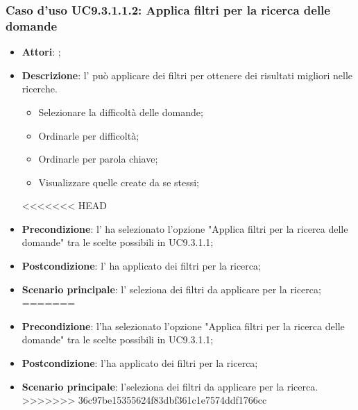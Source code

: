 		 \subsubsection{Caso d'uso UC9.3.1.1.2: Applica filtri per la ricerca delle domande}
		 \label{UC9.3.1.1.2}
		 \begin{itemize}
		 	\item \textbf{Attori}: \uaupro{};
		 	\item \textbf{Descrizione}: l'\uaupro{} può applicare dei filtri per ottenere dei risultati migliori nelle ricerche. 
			 	\begin{itemize}
					\item Selezionare la difficoltà delle domande;
					\item Ordinarle per difficoltà;
					\item Ordinarle per parola chiave;
					\item Visualizzare quelle create da se stessi;
			 	\end{itemize}
<<<<<<< HEAD
		 	\item \textbf{Precondizione}: l'\uaupro{} ha selezionato l'opzione "Applica filtri per la ricerca delle domande" tra le scelte possibili in UC9.3.1.1;
		 	\item \textbf{Postcondizione}: l'\uaupro{} ha applicato dei filtri per la ricerca; 
		 	\item \textbf{Scenario principale}: l'\uaupro{} seleziona dei filtri da applicare per la ricerca;
=======
		 	\item \textbf{Precondizione}: l'\uaupro ha selezionato l'opzione "Applica filtri per la ricerca delle domande" tra le scelte possibili in UC9.3.1.1;
		 	\item \textbf{Postcondizione}: l'\uaupro ha applicato dei filtri per la ricerca; 
		 	\item \textbf{Scenario principale}: l'\uaupro seleziona dei filtri da applicare per la ricerca.
>>>>>>> 36c97be15355624f83dbf361c1e7574ddf1766cc
		 \end{itemize}
		 
